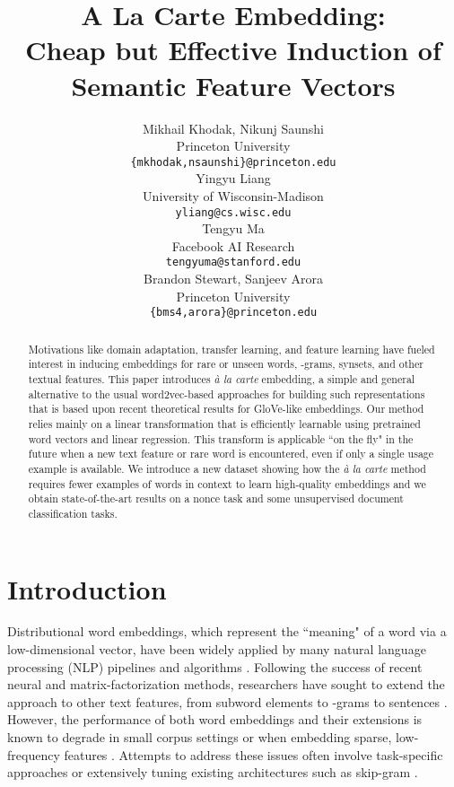 \documentclass[11pt,a4paper]{article}
\title{A La Carte Embedding:\\Cheap but Effective Induction of Semantic Feature Vectors\vspace{0.5cm}}
\author{
	Mikhail Khodak, Nikunj Saunshi \\
	Princeton University \\
	\texttt{\{mkhodak,nsaunshi\}@princeton.edu} \\
	\And
	\qquad Yingyu Liang \\
	\qquad University of Wisconsin-Madison \\
	\qquad \texttt{yliang@cs.wisc.edu} \\
	\AND
	Tengyu Ma \\
	Facebook AI Research \\
	\texttt{tengyuma@stanford.edu}
	\\\And
	\qquad Brandon Stewart, Sanjeev Arora \\
	\qquad Princeton University \\
	\qquad \texttt{\{bms4,arora\}@princeton.edu}
}
\date{}
\begin{document}
\maketitle

\begin{abstract}
	Motivations like domain adaptation, transfer learning, and feature learning have fueled interest in inducing embeddings for rare or unseen words, -grams, synsets, and other textual features.
	This paper introduces {\em\` a la carte} embedding, a simple and general alternative to the usual word2vec-based approaches for building such representations that is based upon recent theoretical results for GloVe-like embeddings.
	Our method relies mainly on a linear transformation that is efficiently learnable using pretrained word vectors and linear regression.
	This transform is applicable ``on the fly" in the future when a new text feature or rare word is encountered, even if only a single usage example is available. 
	We introduce a new dataset showing how the {\em\` a la carte} method requires fewer examples of words in context to learn high-quality embeddings and we obtain state-of-the-art results on a nonce task and some unsupervised document classification tasks.
\end{abstract}



\section{Introduction}\label{sec:intro}

Distributional word embeddings, which represent the ``meaning" of a word via a low-dimensional vector, have been widely applied by many natural language processing (NLP) pipelines and algorithms \cite{Goldberg:16}.
Following the success of recent neural \cite{Mikolov:13} and matrix-factorization \cite{Pennington:14} methods, researchers have sought to extend the approach to other text features, from subword elements to -grams to sentences \cite{Bojanowski:16,Poliak:17,Kiros:15}.
However, the performance of both word embeddings and their extensions is known to degrade in small corpus settings \cite{Adams:17} or when embedding sparse, low-frequency features \cite{Lazaridou:17}.
Attempts to address these issues often involve task-specific approaches \cite{Rothe:15,Iacobacci:15,Pagliardini:18} or extensively tuning existing architectures such as skip-gram \cite{Poliak:17,Herbelot:17}.
\end{document}
